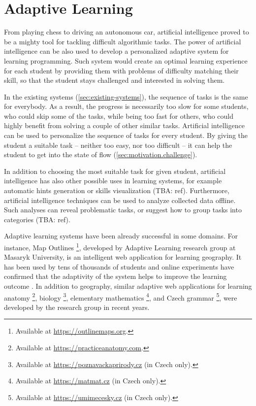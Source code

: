 \chapter{Adaptive Learning}
\label{chap:adaptive-learning}


From playing chess to driving an autonomous car,
  artificial intelligence proved to be a mighty tool
  for tackling difficult algorithmic tasks.
The power of artificial intelligence can be also used
  to develop a personalized adaptive system for learning programming.
Such system would create an optimal learning experience for each student
  by providing them with problems of difficulty matching their skill,
  so that the student stays challenged and interested in solving them.

In the existing systems (\ref{sec:existing-systems}),
  the sequence of tasks is the same for everybody.
As a result, the progress is necessarily too slow for some students,
  who could skip some of the tasks,
  while being too fast for others,
  who could highly benefit from solving a couple of other similar tasks.
Artificial intelligence can be used to personalize
  the sequence of tasks for every student.
By giving the student a suitable task
  -- neither too easy, nor too difficult --
  it can help the student to get into the state of flow
  (\ref{sec:motivation.challenge}).

In addition to choosing the most suitable task for given student,
  artificial intelligence has also other possible uses in learning systems,
  for example automatic hints generation \cite{generating-hints}
  or skills visualization (TBA: ref).
Furthermore, artificial intelligence techniques can be used
  to analyze collected data offline.
Such analyses can reveal problematic tasks,
  or suggest how to group tasks into categories (TBA: ref).

Adaptive learning systems have been already successful in some domains.
For instance, Map Outlines%
  \footnote{Available at \url{https://outlinemaps.org}.},
  developed by Adaptive Learning research group at Masaryk University,
  is an intelligent web application for learning geography.
It has been used by tens of thousands of students
  and online experiments have confirmed
  that the adaptivity of the system helps to improve the learning outcome
  \cite{alg.evaluation-geography}.
In addition to geography, similar adaptive web applications
  for learning anatomy%
  \footnote{Available at \url{https://practiceanatomy.com}.},
  biology%
  \footnote{Available at \url{https://poznavackaprirody.cz} (in Czech only).},
  elementary mathematics%
  \footnote{Available at \url{https://matmat.cz} (in Czech only).},
  and Czech grammar%
  \footnote{Available at \url{https://umimecesky.cz} (in Czech only).},
  were developed by the research group in recent years.

